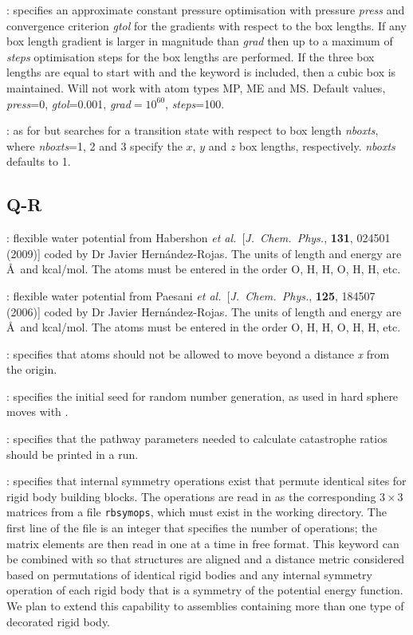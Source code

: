 {{{: specifies an approximate constant pressure optimisation with
pressure {\it press\/} and convergence criterion {\it gtol\/} for the gradients with
respect to the box lengths. If any box length gradient is larger in magnitude than
{\it grad\/} then up to a maximum of {\it steps\/} optimisation steps for the box lengths
are performed.
If the three box lengths are equal to start with and the keyword { \/} is included,
then a cubic box is maintained. 
Will not work with atom types MP, ME and MS.
Default values, {\it press\/}=0, {\it gtol\/}=0.001, {\it grad\/}$=10^{60}$, {\it steps\/}=100.

: as for {} but searches for a transition
state with respect to box length {\it nboxts\/}, where {\it nboxts\/}=1, 2 and 3 specify the
$x$, $y$ and $z$ box lengths, respectively. {\it nboxts\/} defaults to 1.

\subsection{Q-R}
: flexible water potential from  Habershon {\it et al.}~[{\it J.~Chem.~Phys.\/}, 
{\bf 131}, 024501 (2009)] coded by Dr Javier Hern\'andez-Rojas.
The units of length and energy are \AA\ and kcal/mol. The atoms must be entered in the
order O, H, H, O, H, H, etc.

: flexible water potential from  Paesani {\it et al.}~[{\it J.~Chem.~Phys.\/},
{\bf 125}, 184507 (2006)] coded by Dr Javier Hern\'andez-Rojas.
The units of length and energy are \AA\ and kcal/mol. The atoms must be entered in the
order O, H, H, O, H, H, etc.

: specifies that atoms should not be allowed to move beyond a 
distance {\it x\/} from the origin.

: specifies the initial seed for random number generation, as used in 
hard sphere moves with {}.

: specifies that the pathway parameters needed to calculate catastrophe
ratios should be printed in a  run.

: specifies that internal symmetry operations exist that permute
identical sites for rigid body building blocks. 
The operations are read in as the corresponding $3\times3$ matrices from a file
{\tt rbsymops}, which must exist in the working directory.
The first line of the file is an integer that specifies the number of operations; 
the matrix elements are then read in one at a time in free format.
This keyword can be combined with {\/} so that structures are aligned and
a distance metric considered based on permutations of identical rigid
bodies and any internal symmetry operation of each rigid body that is a symmetry
of the potential energy function.
We plan to extend this capability to assemblies containing more than one 
type of decorated rigid body.

}}}
